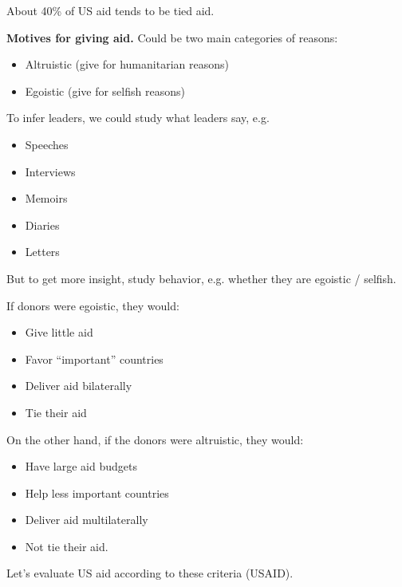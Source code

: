 \documentclass{article}
\begin{document}
About 40\% of US aid tends to be tied aid.

{\bf Motives for giving aid.}  Could be two main categories of reasons:

\begin{itemize}
  \item Altruistic (give for humanitarian reasons)
  \item Egoistic (give for selfish reasons)
\end{itemize}

To infer leaders, we could study what leaders say, e.g.

\begin{itemize}
  \item Speeches
  \item Interviews
  \item Memoirs
  \item Diaries
  \item Letters
\end{itemize}

But to get more insight, study behavior, e.g. whether they are egoistic / selfish.

If donors were egoistic, they would:

\begin{itemize}
  \item Give little aid
  \item Favor ``important'' countries
  \item Deliver aid bilaterally
  \item Tie their aid
\end{itemize}

On the other hand, if the donors were altruistic, they would:
\begin{itemize}
  \item Have large aid budgets
  \item Help less important countries
  \item Deliver aid multilaterally
  \item Not tie their aid.
\end{itemize}

Let's evaluate US aid according to these criteria (USAID).
\end{document}

